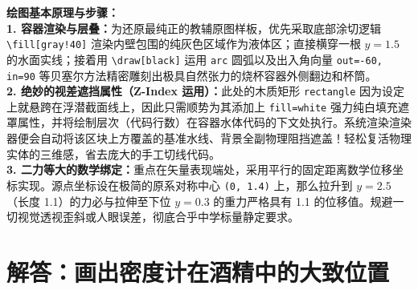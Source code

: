 \vspace{0.6cm}

{\small\color{blue!70!black}
\textbf{绘图基本原理与步骤：}\\
\textbf{1. 容器渲染与层叠：}为还原最纯正的教辅原图样板，优先采取底部涂切逻辑 \texttt{\textbackslash fill[gray!40]} 渲染内壁包围的纯灰色区域作为液体区；直接横穿一根 $y=1.5$ 的水面实线；接着用 \texttt{\textbackslash draw[black]} 运用 \texttt{arc} 圆弧以及出入角向量 \texttt{out=-60, in=90} 等贝塞尔方法精密雕刻出极具自然张力的烧杯容器外侧翻边和杯筒。\\
\textbf{2. 绝妙的视差遮挡属性（Z-Index 运用）：}此处的木质矩形 \texttt{rectangle} 因为设定上就悬跨在浮潜截面线上，因此只需顺势为其添加上 \texttt{fill=white} 强力纯白填充遮罩属性，并将绘制层次（代码行数）在容器水体代码的下文处执行。系统渲染渲染器便会自动将该区块上方覆盖的基准水线、背景全副物理阻挡遮盖！轻松复活物理实体的三维感，省去庞大的手工切线代码。\\
\textbf{3. 二力等大的数学绑定：}重点在矢量表现端处，采用平行的固定距离数学位移坐标实现。源点坐标设在极简的原系对称中心 \texttt{(0, 1.4)} 上，那么拉升到 $y=2.5$ （长度 1.1）的力必与拉伸至下位 $y=0.3$ 的重力严格具有 1.1 的位移值。规避一切视觉透视歪斜或人眼误差，彻底合乎中学标量静定要求。
}

\vspace{1.0cm}



\section{解答：画出密度计在酒精中的大致位置}

\vspace{0.6cm}

